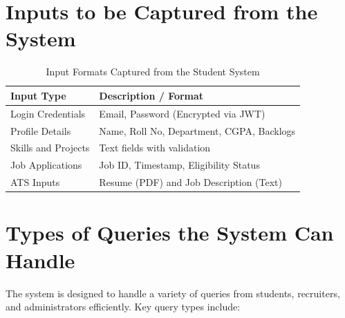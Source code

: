 \documentclass[14pt]{extarticle}
\begin{document}
\section{Inputs to be Captured from the System}
\begin{table}[H]
\centering
\begin{tabular}{@{}ll@{}}
\toprule
\textbf{Input Type} & \textbf{Description / Format} \\ \midrule
Login Credentials & Email, Password (Encrypted via JWT) \\
Profile Details & Name, Roll No, Department, CGPA, Backlogs \\
Skills and Projects & Text fields with validation \\
Job Applications & Job ID, Timestamp, Eligibility Status \\
ATS Inputs & Resume (PDF) and Job Description (Text) \\ 
 \bottomrule
\end{tabular}
\caption{Input Formats Captured from the Student System}
\end{table}

\section{Types of Queries the System Can Handle}

The system is designed to handle a variety of queries from students, recruiters, and administrators efficiently. Key query types include:
\end{document}
